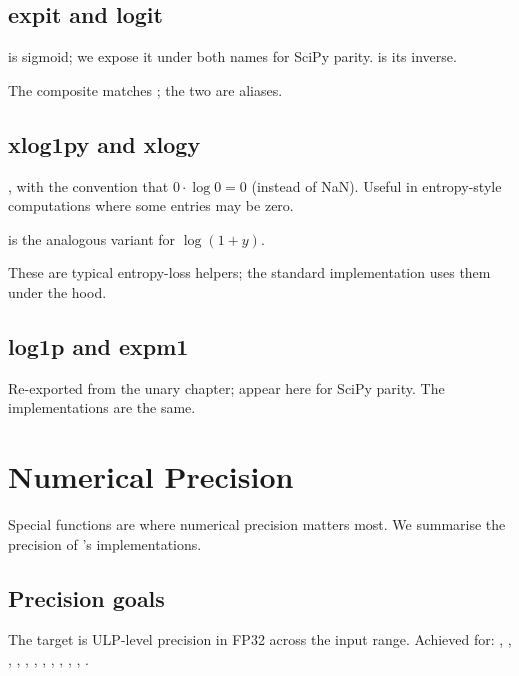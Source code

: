 \subsection{expit and logit}
\label{ssec:special_functions:expit_logit}

 is sigmoid; we expose it
under both names for SciPy parity.  is its inverse.

The composite  matches ; the
two are aliases.

\subsection{xlog1py and xlogy}
\label{ssec:special_functions:xlog_variants}

, with the convention that $0
\cdot \log 0 = 0$ (instead of NaN). Useful in entropy-style
computations where some entries may be zero.

 is the analogous variant for
$\log(1 + y)$.

These are typical entropy-loss helpers; the standard
 implementation uses them under the hood.

\subsection{log1p and expm1}
\label{ssec:special_functions:log1p_expm1}

Re-exported from the unary chapter; appear here for SciPy parity.
The implementations are the same.

\section{Numerical Precision}
\label{sec:special_functions:precision}

Special functions are where numerical precision matters most.
We summarise the precision of \Lucid's implementations.

\subsection{Precision goals}
\label{ssec:special_functions:precision_goals}

The target is ULP-level precision in FP32 across the input
range. Achieved for: , , ,
, , , , ,
, , , .

